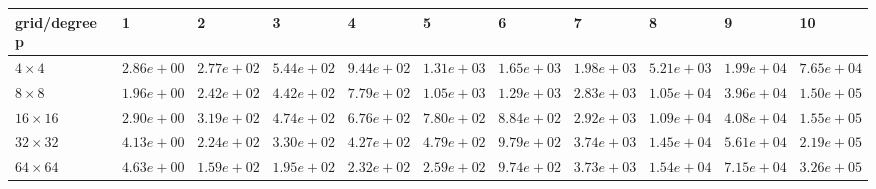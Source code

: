 \begin{tabular}{lllllllllll}
\hline
 grid/degree p   & 1          & 2          & 3          & 4          & 5          & 6          & 7          & 8          & 9          & 10         \\
\hline
 $4 \times 4$    & $2.86e+00$ & $2.77e+02$ & $5.44e+02$ & $9.44e+02$ & $1.31e+03$ & $1.65e+03$ & $1.98e+03$ & $5.21e+03$ & $1.99e+04$ & $7.65e+04$ \\
 $8 \times 8$    & $1.96e+00$ & $2.42e+02$ & $4.42e+02$ & $7.79e+02$ & $1.05e+03$ & $1.29e+03$ & $2.83e+03$ & $1.05e+04$ & $3.96e+04$ & $1.50e+05$ \\
 $16 \times 16$  & $2.90e+00$ & $3.19e+02$ & $4.74e+02$ & $6.76e+02$ & $7.80e+02$ & $8.84e+02$ & $2.92e+03$ & $1.09e+04$ & $4.08e+04$ & $1.55e+05$ \\
 $32 \times 32$  & $4.13e+00$ & $2.24e+02$ & $3.30e+02$ & $4.27e+02$ & $4.79e+02$ & $9.79e+02$ & $3.74e+03$ & $1.45e+04$ & $5.61e+04$ & $2.19e+05$ \\
 $64 \times 64$  & $4.63e+00$ & $1.59e+02$ & $1.95e+02$ & $2.32e+02$ & $2.59e+02$ & $9.74e+02$ & $3.73e+03$ & $1.54e+04$ & $7.15e+04$ & $3.26e+05$ \\
\hline
\end{tabular}